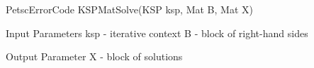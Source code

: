 PetscErrorCode KSPMatSolve(KSP ksp, Mat B, Mat X)

Input Parameters
ksp - iterative context
B - block of right-hand sides

Output Parameter
X - block of solutions
